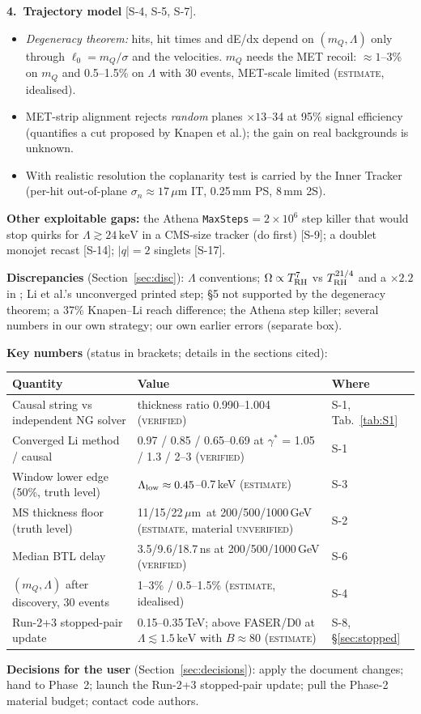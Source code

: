 \documentclass[11pt,a4paper]{article}
\newcommand{\EST}{\textsc{estimate}}
\newcommand{\UNV}{\textsc{unverified}}
\newcommand{\VER}{\textsc{verified}}
\DeclareRobustCommand{\file}[1]{\path{#1}}
\newcommand{\mQ}{m_Q}
\newcommand{\keV}{\ensuremath{\,\mathrm{keV}}}
\newcommand{\um}{\ensuremath{\,\mu\mathrm{m}}}
\newcommand{\gst}{\gamma^*}
\newcommand{\src}[1]{{\color{mid}[#1]}}
\begin{document}
{\textbf{4.\ Trajectory model} \src{S-4, S-5, S-7}.
\begin{itemize}[leftmargin=1.2em,itemsep=0pt,topsep=1pt]
\item \emph{Degeneracy theorem:} hits, hit times and dE/dx depend on $(\mQ,\Lambda)$ only through $\ell_0=\mQ/\sigma$ and the velocities. $\mQ$ needs the MET recoil: $\approx1$--3\% on $\mQ$ and 0.5--1.5\% on $\Lambda$ with 30 events, MET-scale limited (\EST{}, idealised).
\item MET-strip alignment rejects \emph{random} planes $\times13$--34 at 95\% signal efficiency (quantifies a cut proposed by Knapen et al.); the gain on real backgrounds is unknown.
\item With realistic resolution the coplanarity test is carried by the Inner Tracker (per-hit out-of-plane $\sigma_n\approx17\um$ IT, 0.25\,mm PS, 8\,mm 2S).
\end{itemize}

\textbf{Other exploitable gaps:} the Athena \texttt{MaxSteps}$=2\times10^6$ step killer that would stop quirks for $\Lambda\gtrsim24\keV$ in a CMS-size tracker (do first) \src{S-9}; a doublet monojet recast \src{S-14}; $|q|=2$ singlets \src{S-17}.

\textbf{Discrepancies} (Section~\ref{sec:disc}): $\Lambda$ conventions; $\Omega\propto T_{\rm RH}^7$ vs $T_{\rm RH}^{21/4}$ and a $\times2.2$ in \cite{cool}; Li et al.'s unconverged printed step; \cite{LiPei} \S5 not supported by the degeneracy theorem; a 37\% Knapen--Li reach difference; the Athena step killer; several numbers in our own strategy; our own earlier errors (separate box).

\textbf{Key numbers} (status in brackets; details in the sections cited):\\[1pt]
{\footnotesize\begin{tabular}{@{}L{5.6cm}L{8.2cm}L{2.6cm}@{}}\toprule
Quantity & Value & Where\\\midrule
Causal string vs independent NG solver & thickness ratio 0.990--1.004 (\VER{}) & S-1, Tab.~\ref{tab:S1}\\
Converged Li method / causal & 0.97 / 0.85 / 0.65--0.69 at $\gst$ = 1.05 / 1.3 / 2--3 (\VER{}) & S-1\\
Window lower edge (50\%, truth level) & $\Lambda_{\rm low}\approx0.45$--0.7\,keV (\EST{}) & S-3\\
MS thickness floor (truth level) & 11/15/22\um\ at 200/500/1000\,GeV (\EST{}, material \UNV{}) & S-2\\
Median BTL delay & 3.5/9.6/18.7\,ns at 200/500/1000\,GeV (\VER{}) & S-6\\
$(\mQ,\Lambda)$ after discovery, 30 events & 1--3\% / 0.5--1.5\% (\EST{}, idealised) & S-4\\
Run-2+3 stopped-pair update & 0.15--0.35\,TeV; above FASER/D0 at $\Lambda\lesssim1.5\keV$ with $B\approx80$ (\EST{}) & S-8, \S\ref{sec:stopped}\\
\bottomrule\end{tabular}}

\textbf{Decisions for the user} (Section~\ref{sec:decisions}): apply the document changes; hand \file{T3_causal.py} to Phase~2; launch the Run-2+3 stopped-pair update; pull the Phase-2 material budget; contact code authors.
}
\end{document}

